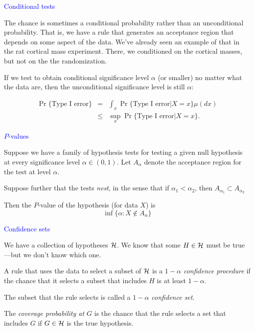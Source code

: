 \documentclass[landscape]{slides}
\newcommand{\cH}{{\cal H}}
\newcommand{\beq}{\begin{equation}}
\newcommand{\eeq}{\end{equation}}
\begin{document}
\begin{slide}
{\textcolor{blue}{Conditional tests}}

The chance is sometimes a conditional probability rather than an unconditional
probability.
That is, we have a rule that generates an acceptance region that depends
on some aspect of the data.
We've already seen an example of that in the rat cortical mass experiment.
There, we conditioned on the cortical masses, but not on the
the randomization.

If we test to obtain conditional significance level $\alpha$ (or smaller) no matter what 
the data are, then the unconditional significance level is still $\alpha$:

\begin{eqnarray*}
   \Pr \{ \mbox{Type I error} \} &=& \int_x \Pr \{ \mbox{Type I error} | X = x \} \mu(dx) \\
      & \le & \sup_x \Pr \{ \mbox{Type I error} | X = x \}.
\end{eqnarray*}

\end{slide}

\begin{slide}
{\textcolor{blue}{$P$-values}}

Suppose we have a family of hypothesis tests for testing a given
null hypothesis at every significance level $\alpha \in (0, 1)$.
Let $A_\alpha$ denote the acceptance region for the test at
level $\alpha$.

Suppose further that the tests {\em nest\/}, in the sense that
if $\alpha_1 < \alpha_2$, then $A_{\alpha_1} \subset A_{\alpha_2}$

Then the $P$-value of the hypothesis (for data $X$) is
\beq
    \inf \{ \alpha : X \notin A_\alpha \}
\eeq

\end{slide}


\begin{slide}
{\textcolor{blue}{Confidence sets}}

We have a collection of hypotheses $\cH$.  
We know that some $H \in \cH$ must
be true---but we don't know which one.

A rule that uses the data to select a subset of $\cH$ is
a {\em $1-\alpha$ confidence procedure\/} if the chance that it selects a subset
that includes $H$ is at least $1-\alpha$.

The subset that the rule selects is called a {\em $1-\alpha$ confidence set\/}.

The {\em coverage probability at $G$\/} is the chance that the rule selects a
set that includes $G$ if $G \in \cH$ is the true hypothesis.

\end{slide}
\end{document}
